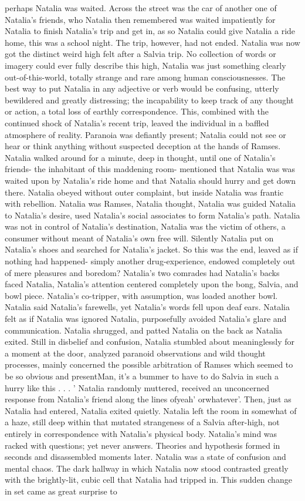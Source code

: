 \documentclass[12pt]{book}
\begin{document}
perhaps Natalia was waited. Across the street was the car of another one of Natalia's friends, who Natalia then remembered was waited impatiently for Natalia to finish Natalia's trip and get in, as so Natalia could give Natalia a ride home, this was a school night. The trip, however, had not ended. Natalia was now got the distinct weird high felt after a Salvia trip. No collection of words or imagery could ever fully describe this high, Natalia was just something clearly out-of-this-world, totally strange and rare among human consciousnesses. The best way to put Natalia in any adjective or verb would be confusing, utterly bewildered and greatly distressing; the incapability to keep track of any thought or action, a total loss of earthly correspondence. This, combined with the continued shock of Natalia's recent trip, leaved the individual in a baffled atmosphere of reality. Paranoia was defiantly present; Natalia could not see or hear or think anything without suspected deception at the hands of Ramses. Natalia walked around for a minute, deep in thought, until one of Natalia's friends- the inhabitant of this maddening room- mentioned that Natalia was was waited upon by Natalia's ride home and that Natalia should hurry and get down there. Natalia obeyed without outer complaint, but inside Natalia was frantic with rebellion. Natalia was Ramses, Natalia thought, Natalia was guided Natalia to Natalia's desire, used Natalia's social associates to form Natalia's path. Natalia was not in control of Natalia's destination, Natalia was the victim of others, a consumer without meant of Natalia's own free will. Silently Natalia put on Natalia's shoes and searched for Natalia's jacket. So this was the end, leaved as if nothing had happened- simply another drug-experience, endowed completely out of mere pleasures and boredom? Natalia's two comrades had Natalia's backs faced Natalia, Natalia's attention centered completely upon the bong, Salvia, and bowl piece. Natalia's co-tripper, with assumption, was loaded another bowl. Natalia said Natalia's farewells, yet Natalia's words fell upon deaf ears. Natalia felt as if Natalia was ignored Natalia, purposefully avoided Natalia's glare and communication. Natalia shrugged, and patted Natalia on the back as Natalia exited. Still in disbelief and confusion, Natalia stumbled about meaninglessly for a moment at the door, analyzed paranoid observations and wild thought processes, mainly concerned the possible arbitration of Ramses which seemed to be so obvious and presentMan, it's a bummer to have to do Salvia in such a hurry like this . . . ' Natalia randomly muttered, received an unconcerned response from Natalia's friend along the lines ofyeah' orwhatever'. Then, just as Natalia had entered, Natalia exited quietly. Natalia left the room in somewhat of a haze, still deep within that mutated strangeness of a Salvia after-high, not entirely in correspondence with Natalia's physical body. Natalia's mind was racked with questions; yet never answers. Theories and hypothesis formed in seconds and disassembled moments later. Natalia was a state of confusion and mental chaos. The dark hallway in which Natalia now stood contrasted greatly with the brightly-lit, cubic cell that Natalia had tripped in. This sudden change in set came as great surprise to 
\end{document}
